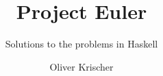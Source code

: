 \documentclass{scrreprt}
\numberwithin{equation}{chapter}
\begin{document}
\title{Project Euler}
\author{Oliver Krischer}
\subtitle{Solutions to the problems in Haskell}
\maketitle
\tableofcontents




\end{document}
